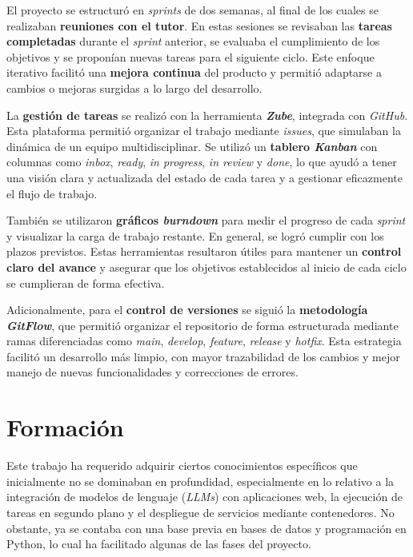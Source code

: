 El proyecto se estructuró en \textit{sprints} de dos semanas, al final de los cuales se realizaban \textbf{reuniones con el tutor}. 
En estas sesiones se revisaban las \textbf{tareas completadas} durante el \textit{sprint} anterior, 
se evaluaba el cumplimiento de los objetivos y se proponían nuevas tareas para el siguiente ciclo. 
Este enfoque iterativo facilitó una \textbf{mejora continua} del producto y permitió adaptarse a cambios o mejoras surgidas a lo largo del desarrollo.

La \textbf{gestión de tareas} se realizó con la herramienta \textbf{\emph{Zube}}, integrada con \textit{GitHub}. Esta plataforma permitió organizar el trabajo mediante 
\textit{issues}, que simulaban la dinámica de un equipo multidisciplinar. Se utilizó un \textbf{tablero \emph{Kanban}} con columnas como 
\textit{inbox}, \textit{ready}, \textit{in progress}, \textit{in review} y \textit{done}, lo que ayudó a tener una visión clara y actualizada del estado de cada tarea y a 
gestionar eficazmente el flujo de trabajo.

También se utilizaron \textbf{gráficos \textit{burndown}} para medir el progreso de cada \textit{sprint} y visualizar la carga de trabajo restante. 
En general, se logró cumplir con los plazos previstos. Estas herramientas resultaron útiles para mantener un \textbf{control claro del avance} y asegurar que los objetivos establecidos al inicio de cada ciclo se cumplieran de forma efectiva.

Adicionalmente, para el \textbf{control de versiones} se siguió la \textbf{metodología \textit{GitFlow}}, que permitió organizar el repositorio de forma estructurada 
mediante ramas diferenciadas como \textit{main}, \textit{develop}, \textit{feature}, \textit{release} y \textit{hotfix}. Esta estrategia facilitó un desarrollo más limpio, 
con mayor trazabilidad de los cambios y mejor manejo de nuevas funcionalidades y correcciones de errores.

\section{Formación}

Este trabajo ha requerido adquirir ciertos conocimientos específicos que inicialmente no se dominaban en profundidad, especialmente en lo relativo a la integración de modelos de lenguaje (\textit{LLMs}) con aplicaciones web, la ejecución de tareas en segundo plano y el despliegue de servicios mediante contenedores. No obstante, ya se contaba con una base previa en bases de datos y programación en Python, lo cual ha facilitado algunas de las fases del proyecto.

